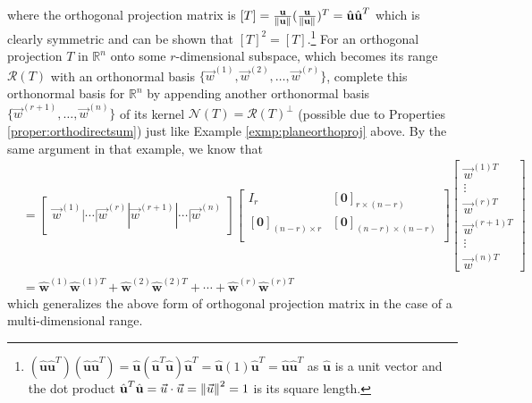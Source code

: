 where the orthogonal projection matrix is $[T] = \frac{\textbf{u}}{\norm{\textbf{u}}}(\frac{\textbf{u}}{\norm{\textbf{u}}})^T = \hat{\textbf{u}}\hat{\textbf{u}}^T$ which is clearly symmetric and can be shown that $[T]^2 = [T]$.\footnote{$(\hat{\textbf{u}}\hat{\textbf{u}}^T)(\hat{\textbf{u}}\hat{\textbf{u}}^T) = \hat{\textbf{u}}(\hat{\textbf{u}}^T\hat{\textbf{u}})\hat{\textbf{u}}^T = \hat{\textbf{u}}(1)\hat{\textbf{u}}^T = \hat{\textbf{u}}\hat{\textbf{u}}^T$ as $\hat{\textbf{u}}$ is a unit vector and the dot product $\hat{\textbf{u}}^T\hat{\textbf{u}} = \vec{u}\cdot\vec{u} = \norm{\vec{u}}^2 = 1$ is its square length.} For an orthogonal projection $T$ in $\mathbb{R}^n$ onto some $r$-dimensional subspace, which becomes its range $\mathcal{R}(T)$ with an orthonormal basis $\{\vec{w}^{(1)}, \vec{w}^{(2)}, \ldots, \vec{w}^{(r)}\}$, complete this orthonormal basis for $\mathbb{R}^n$ by appending another orthonormal basis $\{\vec{w}^{(r+1)}, \ldots, \vec{w}^{(n)}\}$ of its kernel $\mathcal{N}(T) = \mathcal{R}(T)^\perp$ (possible due to Properties \ref{proper:orthodirectsum}) just like Example \ref{exmp:planeorthoproj} above. By the same argument in that example, we know that
\begin{align}
[T] &= 
\begin{bmatrix}
\vec{w}^{(1)}|\cdots|\vec{w}^{(r)}|\vec{w}^{(r+1)}|\cdots|\vec{w}^{(n)}
\end{bmatrix}
\begin{bmatrix}
I_r & [\textbf{0}]_{r\times(n-r)} \\
[\textbf{0}]_{(n-r)\times r} & [\textbf{0}]_{(n-r)\times(n-r)} \\
\end{bmatrix}
\left[\begin{array}{c} 
\vec{w}^{(1)T} \\
\hline
\vdots \\
\hline
\vec{w}^{(r)T} \\
\hline
\vec{w}^{(r+1)T} \\
\hline 
\vdots \\
\hline
\vec{w}^{(n)T}
\end{array}\right] \nonumber \\
&= \hat{\textbf{w}}^{(1)}\hat{\textbf{w}}^{(1)T} + \hat{\textbf{w}}^{(2)}\hat{\textbf{w}}^{(2)T} + \cdots + \hat{\textbf{w}}^{(r)}\hat{\textbf{w}}^{(r)T} \label{eqn:projrank1sum}
\end{align}
which generalizes the above form of orthogonal projection matrix in the case of a multi-dimensional range.

